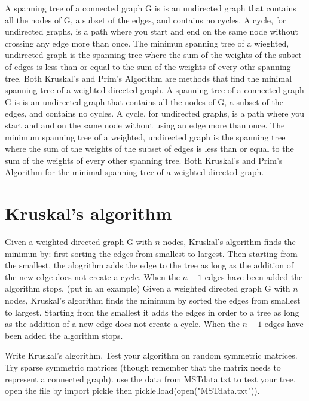 A spanning tree of a connected graph G is is an undirected graph that contains all the nodes of G, a subset of the edges, and contains no cycles. A cycle, for undirected graphs, is a path where you start and end on the same node without crossing any edge more than once. The minimun spanning tree of a wieghted, undirected graph is the spanning tree where the sum of the weights of the subset of edges is less than or equal to the sum of the weights of every othr spanning tree. Both Kruskal's and Prim's Algorithm are methods that find the minimal spanning tree of a weighted directed graph.
A spanning tree of a connected graph G is is an undirected graph that contains all the nodes of G, a subset of the edges, and contains no cycles. A cycle, for undirected graphs, is a path where you start and and on the same node without using an edge more than once. The minimum spanning tree of a weighted, undirected graph is the spanning tree where the sum of the weights of the subset of edges is less than or equal to the sum of the weights of every other spanning tree. Both Kruskal's and Prim's Algorithm for the minimal spanning tree of a weighted directed graph.

\section*{Kruskal's algorithm}

Given a weighted directed graph G with $n$ nodes, Kruskal's algorithm finds the minimun by: first sorting the edges from smallest to largest. Then starting from the smallest, the alogrithm adds the edge to the tree as long as the addition of the new edge does not create a cycle. When the $n-1$ edges have been added the algorithm stops. (put in an example)
Given a weighted directed graph G with $n$ nodes, Kruskal's algorithm finds the minimum by sorted the edges from smallest to largest. Starting from the smallest it adds the edges in order to a tree as long as the addition of a new edge does not create a cycle. When the $n-1$ edges have been added the algorithm stops. 

\begin{problem}
Write Kruskal's algorithm. Test your algorithm on random symmetric matrices. Try sparse symmetric matrices (though remember that the matrix needs to represent a connected graph). use the data from MSTdata.txt to test your tree. open the file by import pickle then pickle.load(open("MSTdata.txt")).
\end{problem}

